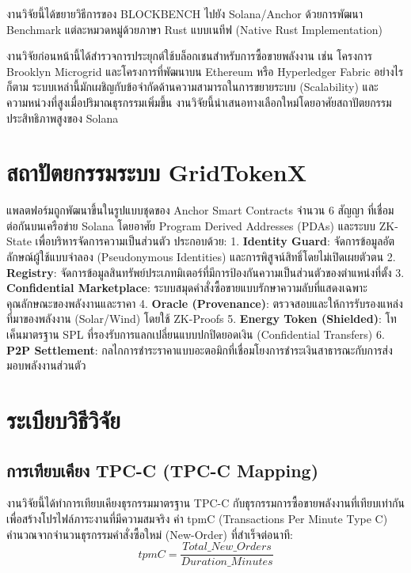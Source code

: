 \documentclass[conference,10pt]{IEEEtran}
\begin{document}
งานวิจัยนี้ได้ขยายวิธีการของ BLOCKBENCH ไปยัง Solana/Anchor ด้วยการพัฒนา Benchmark แต่ละหมวดหมู่ด้วยภาษา Rust แบบเนทีฟ (Native Rust Implementation)

งานวิจัยก่อนหน้านี้ได้สำรวจการประยุกต์ใช้บล็อกเชนสำหรับการซื้อขายพลังงาน เช่น โครงการ Brooklyn Microgrid \cite{b2} และโครงการที่พัฒนาบน Ethereum หรือ Hyperledger Fabric \cite{b5, b6} อย่างไรก็ตาม ระบบเหล่านี้มักเผชิญกับข้อจำกัดด้านความสามารถในการขยายระบบ (Scalability) และความหน่วงที่สูงเมื่อปริมาณธุรกรรมเพิ่มขึ้น งานวิจัยนี้นำเสนอทางเลือกใหม่โดยอาศัยสถาปัตยกรรมประสิทธิภาพสูงของ Solana

\section{สถาปัตยกรรมระบบ GridTokenX}
แพลตฟอร์มถูกพัฒนาขึ้นในรูปแบบชุดของ Anchor Smart Contracts จำนวน 6 สัญญา ที่เชื่อมต่อกันบนเครือข่าย Solana โดยอาศัย Program Derived Addresses (PDAs) และระบบ ZK-State เพื่อบริหารจัดการความเป็นส่วนตัว ประกอบด้วย:
1. \textbf{Identity Guard}: จัดการข้อมูลอัตลักษณ์ผู้ใช้แบบจำลอง (Pseudonymous Identities) และการพิสูจน์สิทธิ์โดยไม่เปิดเผยตัวตน
2. \textbf{Registry}: จัดการข้อมูลสินทรัพย์ประเภทมิเตอร์ที่มีการป้องกันความเป็นส่วนตัวของตำแหน่งที่ตั้ง
3. \textbf{Confidential Marketplace}: ระบบสมุดคำสั่งซื้อขายแบบรักษาความลับที่แสดงเฉพาะคุณลักษณะของพลังงานและราคา
4. \textbf{Oracle (Provenance)}: ตรวจสอบและให้การรับรองแหล่งที่มาของพลังงาน (Solar/Wind) โดยใช้ ZK-Proofs
5. \textbf{Energy Token (Shielded)}: โทเค็นมาตรฐาน SPL ที่รองรับการแลกเปลี่ยนแบบปกปิดยอดเงิน (Confidential Transfers)
6. \textbf{P2P Settlement}: กลไกการชำระราคาแบบอะตอมิกที่เชื่อมโยงการชำระเงินสาธารณะกับการส่งมอบพลังงานส่วนตัว

\section{ระเบียบวิธีวิจัย}

\subsection{การเทียบเคียง TPC-C (TPC-C Mapping)}
งานวิจัยนี้ได้ทำการเทียบเคียงธุรกรรมมาตรฐาน TPC-C \cite{b1} กับธุรกรรมการซื้อขายพลังงานที่เทียบเท่ากัน เพื่อสร้างโปรไฟล์ภาระงานที่มีความสมจริง ค่า tpmC (Transactions Per Minute Type C) คำนวณจากจำนวนธุรกรรมคำสั่งซื้อใหม่ (New-Order) ที่สำเร็จต่อนาที:
\begin{equation}
tpmC = \frac{Total\_New\_Orders}{Duration\_Minutes}
\end{equation}
\end{document}
